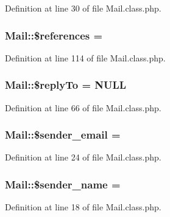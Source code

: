 Definition at line 30 of file Mail.\+class.\+php.

\hypertarget{classMail_abcd438320caac44b166df90ba9092fe9}{}
\subsubsection[{\$references}]{\setlength{\rightskip}{0pt plus 5cm}Mail\+::\$references = \textquotesingle{}\textquotesingle{}}\label{classMail_abcd438320caac44b166df90ba9092fe9}


Definition at line 114 of file Mail.\+class.\+php.

\hypertarget{classMail_a55788852017ccc1716af69cdde26df99}{}
\subsubsection[{\$reply\+To}]{\setlength{\rightskip}{0pt plus 5cm}Mail\+::\$reply\+To = N\+U\+L\+L}\label{classMail_a55788852017ccc1716af69cdde26df99}


Definition at line 66 of file Mail.\+class.\+php.

\hypertarget{classMail_a94dccbbdc161e818d90e41ad197ebe85}{}
\subsubsection[{\$sender\+\_\+email}]{\setlength{\rightskip}{0pt plus 5cm}Mail\+::\$sender\+\_\+email = \textquotesingle{}\textquotesingle{}}\label{classMail_a94dccbbdc161e818d90e41ad197ebe85}


Definition at line 24 of file Mail.\+class.\+php.

\hypertarget{classMail_a0ad6aa18dc8ea8c632bb7a82175e8d68}{}
\subsubsection[{\$sender\+\_\+name}]{\setlength{\rightskip}{0pt plus 5cm}Mail\+::\$sender\+\_\+name = \textquotesingle{}\textquotesingle{}}\label{classMail_a0ad6aa18dc8ea8c632bb7a82175e8d68}


Definition at line 18 of file Mail.\+class.\+php.

